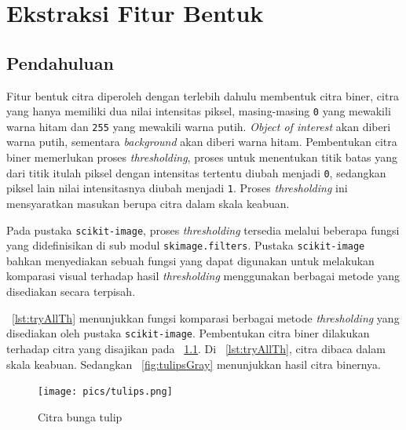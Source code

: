 \chapter{Ekstraksi Fitur Bentuk}
\section{Pendahuluan}

Fitur bentuk citra diperoleh dengan terlebih dahulu membentuk citra biner, citra yang hanya memiliki dua nilai intensitas piksel, masing-masing \texttt{0} yang mewakili warna hitam dan \texttt{255} yang mewakili warna putih. \textit{Object of interest} akan diberi warna putih, sementara \textit{background} akan diberi warna hitam. Pembentukan citra biner memerlukan proses \textit{thresholding}, proses untuk menentukan titik batas yang dari titik itulah piksel dengan intensitas tertentu diubah menjadi \texttt{0}, sedangkan piksel lain nilai intensitasnya diubah menjadi \texttt{1}. Proses \textit{thresholding} ini mensyaratkan masukan berupa citra dalam skala keabuan.

Pada pustaka \texttt{scikit-image}, proses \textit{thresholding} tersedia melalui beberapa fungsi yang didefinisikan di sub modul \texttt{skimage.filters}. Pustaka \texttt{scikit-image} bahkan menyediakan sebuah fungsi yang dapat digunakan untuk melakukan komparasi visual terhadap hasil \textit{thresholding} menggunakan berbagai metode yang disediakan secara terpisah.

\lstlistingname~\ref{lst:tryAllTh} menunjukkan fungsi komparasi berbagai metode \textit{thresholding} yang disediakan oleh pustaka \texttt{scikit-image}. Pembentukan citra biner dilakukan terhadap citra yang disajikan pada \figurename~\ref{fig:tulips}. Di \lstlistingname~\ref{lst:tryAllTh}, citra dibaca dalam skala keabuan. Sedangkan \figurename~\ref{fig:tulipsGray} menunjukkan hasil citra binernya.

\scriptsize

\normalsize

\begin{figure}
  \begin{center}
    \texttt{[image: pics/tulips.png]}
    \caption{Citra bunga tulip}
    \label{fig:tulips}
  \end{center}
\end{figure}

